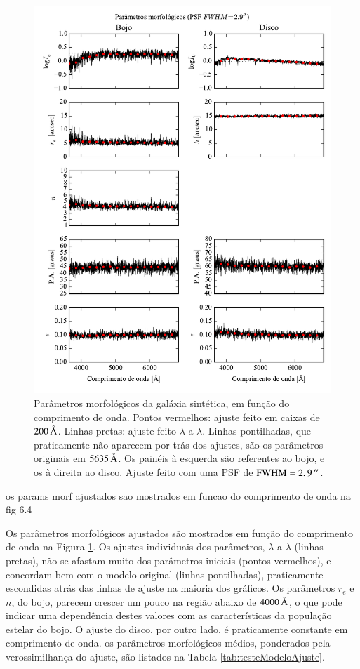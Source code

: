 \begin{figure}
	\includegraphics{figuras/simulation_fitparams}
	\caption[Parâmetros morfológicos da galáxia sintética]
	{Parâmetros morfológicos da galáxia sintética, em função do comprimento de
	onda. Pontos vermelhos: ajuste feito em caixas de $200\,\text{\normalfont\AA}$. Linhas
	pretas: ajuste feito $\lambda$-a-$\lambda$. Linhas pontilhadas, que
	praticamente não aparecem por trás dos ajustes, são os parâmetros originais em
	$5635\,\text{\normalfont\AA}$. Os painéis à esquerda são referentes ao bojo, e os à direita
	ao disco. Ajuste feito com uma PSF de $\mathrm{FWHM} = 2,9\,^{\prime\prime}$.
	}
	\label{fig:testFitParams}
\end{figure}

os params morf ajustados sao mostrados em funcao do comprimento de onda  na fig
6.4

Os parâmetros morfológicos ajustados são mostrados em função do comprimento de
onda na Figura \ref{fig:testFitParams}. Os ajustes individuais dos parâmetros,
$\lambda$-a-$\lambda$ (linhas pretas), não se afastam muito dos parâmetros
iniciais (pontos vermelhos), e concordam bem com o modelo original (linhas
pontilhadas), praticamente escondidas atrás das linhas de ajuste na maioria dos
gráficos. Os parâmetros $r_e$ e $n$, do bojo, parecem crescer um pouco na região
abaixo de $4000\,\text{\normalfont\AA}$, o que pode indicar uma dependência destes valores
com as características da população estelar do bojo. O ajuste do disco, por
outro lado, é praticamente constante em comprimento de onda.
os parâmetros morfológicos médios, ponderados pela verossimilhança do ajuste,
são listados na Tabela \ref{tab:testeModeloAjuste}.

